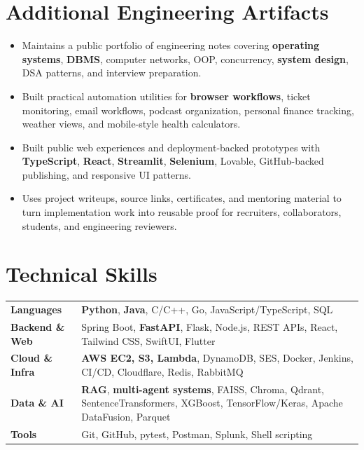 \documentclass[10pt,a4paper]{article}
\newcommand{\tech}[1]{\textbf{#1}}
\begin{document}
\section{Additional Engineering Artifacts}
\begin{itemize}
  \item Maintains a public portfolio of engineering notes covering \tech{operating systems}, \tech{DBMS}, computer networks, OOP, concurrency, \tech{system design}, DSA patterns, and interview preparation.
  \item Built practical automation utilities for \tech{browser workflows}, ticket monitoring, email workflows, podcast organization, personal finance tracking, weather views, and mobile-style health calculators.
  \item Built public web experiences and deployment-backed prototypes with \tech{TypeScript}, \tech{React}, \tech{Streamlit}, \tech{Selenium}, Lovable, GitHub-backed publishing, and responsive UI patterns.
  \item Uses project writeups, source links, certificates, and mentoring material to turn implementation work into reusable proof for recruiters, collaborators, students, and engineering reviewers.
\end{itemize}

\section{Technical Skills}
\begin{tabularx}{\textwidth}{@{}>{\bfseries}p{1.35in}X@{}}
Languages & \textbf{Python}, \textbf{Java}, C/C++, Go, JavaScript/TypeScript, SQL\\
Backend \& Web & Spring Boot, \textbf{FastAPI}, Flask, Node.js, REST APIs, React, Tailwind CSS, SwiftUI, Flutter\\
Cloud \& Infra & \textbf{AWS EC2, S3, Lambda}, DynamoDB, SES, Docker, Jenkins, CI/CD, Cloudflare, Redis, RabbitMQ\\
Data \& AI & \textbf{RAG}, \textbf{multi-agent systems}, FAISS, Chroma, Qdrant, SentenceTransformers, XGBoost, TensorFlow/Keras, Apache DataFusion, Parquet\\
Tools & Git, GitHub, pytest, Postman, Splunk, Shell scripting
\end{tabularx}
\end{document}
